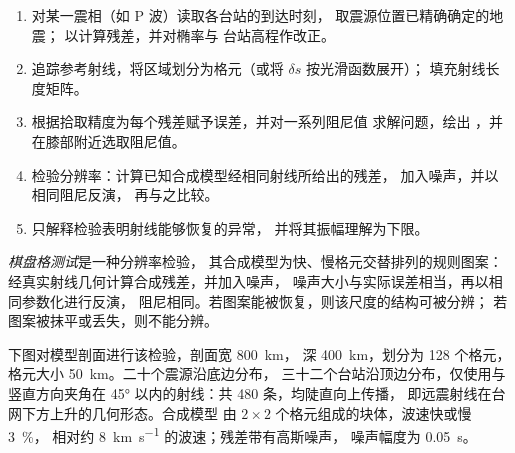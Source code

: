 \begin{method}[走时层析成像]\label{met:b3:seismology-imaging:tomo}
\begin{enumerate}
  \item 对某一震相（如 P 波）读取各台站的到达时刻，
        取震源位置已精确确定的地震；
        以计算残差，并对椭率与
        台站高程作改正。
  \item 追踪参考射线，将区域划分为格元（或将 $\delta s$ 按光滑函数展开）；
        填充射线长度矩阵。
  \item 根据拾取精度为每个残差赋予误差，并对一系列阻尼值
        求解问题，绘出
        ，并在膝部附近选取阻尼值。
  \item 检验分辨率：计算已知合成模型经相同射线所给出的残差，
        加入噪声，并以相同阻尼反演，
        再与之比较。
  \item 只解释检验表明射线能够恢复的异常，
        并将其振幅理解为下限。
\end{enumerate}
\end{method}

\begin{definition}[棋盘格测试]\label{def:b3:seismology-imaging:checkerboard}
\emph{棋盘格测试}是一种分辨率检验，
其合成模型为快、慢格元交替排列的规则图案：
经真实射线几何计算合成残差，并加入噪声，
噪声大小与实际误差相当，再以相同参数化进行反演，
阻尼相同。若图案能被恢复，则该尺度的结构可被分辨；
若图案被抹平或丢失，则不能分辨。
\end{definition}

下图对模型剖面进行该检验，剖面宽 \qty{800}{km}，
深 \qty{400}{km}，划分为 128 个格元，格元大小 \qty{50}{km}。二十个震源沿底边分布，
三十二个台站沿顶边分布，仅使用与竖直方向夹角在
\ang{45} 以内的射线：共 480 条，均陡直向上传播，
即远震射线在台网下方上升的几何形态。合成模型
由 $2\times2$ 个格元组成的块体，波速快或慢 \qty{3}{\percent}，
相对约 \qty{8}{km.s^{-1}} 的波速；残差带有高斯噪声，
噪声幅度为 \qty{0.05}{s}。


